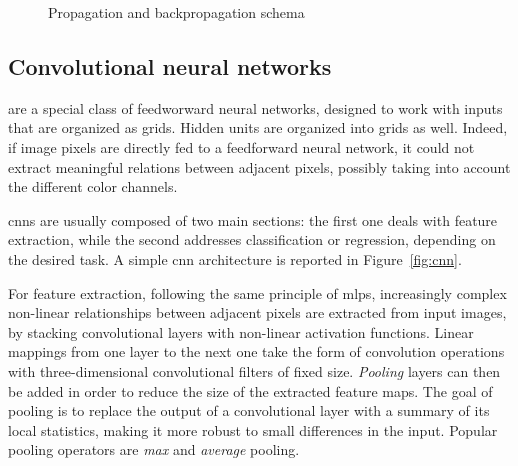 \documentclass[%
    corpo=12pt,
    twoside,
    stile=classica,   
    tipotesi=magistrale,
    evenboxes,
    english,
	numerazioneromana,
]{toptesi}
\begin{document}
\begin{figure}[ht]
	\centering
	\caption{Propagation and backpropagation schema}
	\label{fig:forwardbackward}
\end{figure}

\subsection{Convolutional neural networks}
 are a special class of feedworward neural networks, designed to work with inputs that are organized as grids. Hidden units are organized into grids as well. Indeed, if image pixels are directly fed to a feedforward neural network, it could not extract meaningful relations between adjacent pixels, possibly taking into account the different color channels.

\bigskip
\Glspl{cnn} are usually composed of two main sections: the first one deals with feature extraction, while the second addresses classification or regression, depending on the desired task. A simple \gls{cnn} architecture is reported in Figure~\ref{fig:cnn}.

For feature extraction, following the same principle of \glspl{mlp}, increasingly complex non-linear relationships between adjacent pixels are extracted from input images, by stacking convolutional layers with non-linear activation functions. Linear mappings from one layer to the next one take the form of convolution operations with three-dimensional convolutional filters of fixed size. \textit{Pooling} layers can then be added in order to reduce the size of the extracted feature maps. The goal of pooling is to replace the output of a convolutional layer with a summary of its local statistics, making it more robust to small differences in the input. Popular pooling operators are \textit{max} and \textit{average} pooling.
\end{document}
